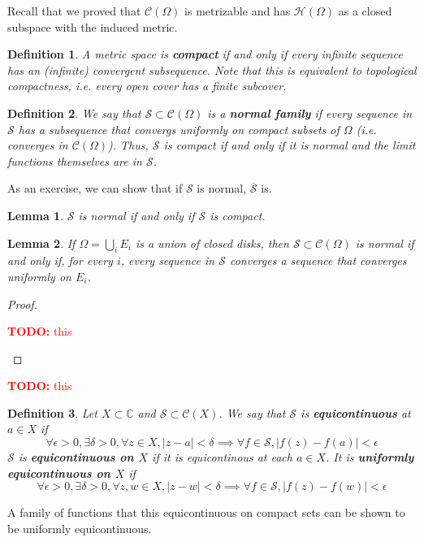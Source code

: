 \documentclass{article}
\newtheorem{lemma}{Lemma}
\newcommand{\mbb}[1]{\mathbb{#1}}
\newcommand{\mc}[1]{\mathcal{#1}}
\newtheorem{definition}{Definition}
\newcommand{\TODO}[1]{\begin{center}\huge{\textcolor{red}{\textbf{TODO:} #1}}\end{center}}
\begin{document}
Recall that we proved that \(\mc{C}(\Omega)\) is metrizable and has \(\mc{H}(\Omega)\) as a closed subspace with the induced metric.
\begin{definition}
A metric space is \textbf{compact} if and only if every infinite sequence has an (infinite) convergent subsequence. Note that this is equivalent to topological compactness, i.e. every open cover has a finite subcover.
\end{definition}
\begin{definition}
We say that \(\mc{S} \subset \mc{C}(\Omega)\) is a \textbf{normal family} if every sequence in \(\mc{S}\) has a subsequence that convergs uniformly on compact subsets of \(\Omega\) (i.e. converges in \(\mc{C}(\Omega)\)). Thus, \(\mc{S}\) is compact if and only if it is normal and the limit functions themselves are in \(\mc{S}\).
\end{definition}
As an exercise, we can show that if \(\mc{S}\) is normal, \(\overline{\mc{S}}\) is.
\begin{lemma}
\(\mc{S}\) is normal if and only if \(\overline{\mc{S}}\) is compact.
\end{lemma}
\begin{lemma}
If \(\Omega = \bigcup_iE_i\) is a union of closed disks, then \(\mc{S} \subset \mc{C}(\Omega)\) is normal if and only if, for every \(i\), every sequence in \(\mc{S}\) converges a sequence that converges uniformly on \(E_i\).
\end{lemma}
\begin{proof}
\TODO{this}
\end{proof}

\TODO{this}

\begin{definition}
Let \(X \subset \mbb{C}\) and \(\mc{S} \subset \mc{C}(X)\). We say that \(\mc{S}\) is \textbf{equicontinuous} at \(a \in X\) if
\[\forall \epsilon > 0, \exists \delta > 0, \forall z \in X, |z - a| < \delta \implies \forall f \in \mc{S}, |f(z) - f(a)| < \epsilon\]
\(\mc{S}\) is \textbf{equicontinuous on \(X\)} if it is equicontinous at each \(a \in X\). It is \textbf{uniformly equicontinuous on \(X\)} if
\[\forall \epsilon > 0, \exists \delta > 0, \forall z, w \in X, |z - w| <\delta \implies \forall f \in \mc{S}, |f(z) - f(w)| < \epsilon\]
\end{definition}
A family of functions that this equicontinuous on compact sets can be shown to be uniformly equicontinuous.
\end{document}
